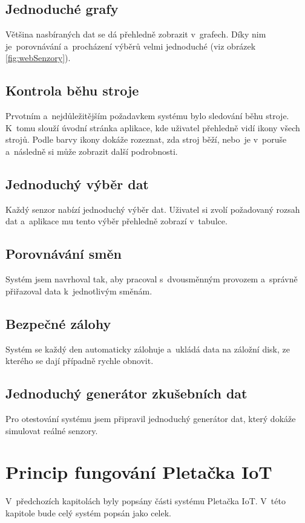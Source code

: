\documentclass{template/socthesis}
\begin{document}
\subsection{Jednoduché grafy}
Většina nasbíraných dat se dá přehledně zobrazit v~grafech. 
Díky nim je~porovnávání a~procházení výběrů velmi jednoduché (viz obrázek \ref{fig:webSenzory}).


\subsection{Kontrola běhu stroje}
Prvotním a~nejdůležitějším požadavkem systému bylo sledování běhu stroje.
K~tomu slouží úvodní stránka aplikace, kde uživatel přehledně vidí ikony všech strojů.
Podle barvy ikony dokáže rozeznat, zda stroj běží, nebo~je v~poruše a~následně si může zobrazit další podrobnosti. 

\subsection{Jednoduchý výběr dat}
Každý senzor nabízí jednoduchý výběr dat.
Uživatel si zvolí požadovaný rozsah dat a~aplikace mu tento výběr přehledně zobrazí v~tabulce.


\subsection{Porovnávání směn}
Systém jsem navrhoval tak, aby pracoval s~dvousměnným provozem a~správně přiřazoval data k~jednotlivým směnám.


\subsection{Bezpečné zálohy}
Systém se každý den automaticky zálohuje a~ukládá data na záložní disk, ze kterého se dají případně rychle obnovit.


\subsection{Jednoduchý generátor zkušebních dat}
Pro otestování systému jsem připravil jednoduchý generátor dat, který dokáže simulovat reálné senzory.



\section{Princip fungování Pletačka IoT}
V~předchozích kapitolách byly popsány části systému Pletačka IoT.
V~této kapitole bude celý systém popsán jako celek.
\end{document}
